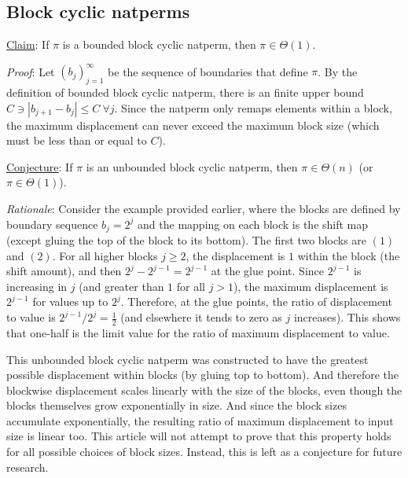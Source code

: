 \documentclass[12pt,reqno]{article}
\begin{document}
\subsection{Block cyclic natperms}

\underline{Claim}: If $\pi$ is a bounded block cyclic natperm, then $\pi \in \Theta(1)$.

\textit{Proof}: Let $(b_j)_{j=1}^{\infty}$ be the sequence of boundaries that define $\pi$. By the definition of bounded block cyclic natperm, there is an finite upper bound $C \ni | b_{j+1} - b_j | \leq C \  \forall j$. Since the natperm only remaps elements within a block, the maximum displacement can never exceed the maximum block size (which must be less than or equal to $C$).

\underline{Conjecture}: If $\pi$ is an unbounded block cyclic natperm, then $\pi \in \Theta(n)$ (or $\pi \in \Theta(1)$).

\textit{Rationale}: Consider the example provided earlier, where the blocks are defined by boundary sequence $b_j = 2^j$ and the mapping on each block is the shift map (except gluing the top of the block to its bottom). The first two blocks are $(1)$ and $(2)$. For all higher blocks $j \geq 2$, the displacement is $1$ within the block (the shift amount), and then $2^j - 2^{j-1} = 2^{j-1}$ at the glue point. Since $2^{j-1}$ is increasing in $j$ (and greater than $1$ for all $j > 1$), the maximum displacement is $2^{j-1}$ for values up to $2^j$. Therefore, at the glue points, the ratio of displacement to value is $2^{j-1} / 2^j = \frac{1}{2}$ (and elsewhere it tends to zero as $j$ increases). This shows that one-half is the limit value for the ratio of maximum displacement to value.

This unbounded block cyclic natperm was constructed to have the greatest possible displacement within blocks (by gluing top to bottom). And therefore the blockwise displacement scales linearly with the size of the blocks, even though the blocks themselves grow exponentially in size. And since the block sizes accumulate exponentially, the resulting ratio of maximum displacement to input size is linear too. This article will not attempt to prove that this property holds for all possible choices of block sizes. Instead, this is left as a conjecture for future research.
\end{document}
